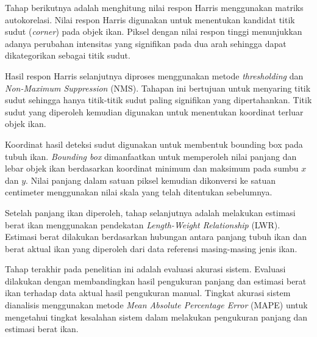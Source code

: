 Tahap berikutnya adalah menghitung nilai respon Harris menggunakan matriks autokorelasi. 
Nilai respon Harris digunakan untuk menentukan kandidat titik sudut (\emph{corner}) pada objek ikan. 
Piksel dengan nilai respon tinggi menunjukkan adanya perubahan intensitas yang signifikan pada dua arah sehingga dapat dikategorikan sebagai titik sudut.

Hasil respon Harris selanjutnya diproses menggunakan metode \emph{thresholding} dan \emph{Non-Maximum Suppression} (NMS). 
Tahapan ini bertujuan untuk menyaring titik sudut sehingga hanya titik-titik sudut paling signifikan yang dipertahankan. 
Titik sudut yang diperoleh kemudian digunakan untuk menentukan koordinat terluar objek ikan.

Koordinat hasil deteksi sudut digunakan untuk membentuk bounding box pada tubuh ikan. 
\emph{Bounding box} dimanfaatkan untuk memperoleh nilai panjang dan lebar objek ikan berdasarkan koordinat minimum dan maksimum pada sumbu \(x\) dan \(y\). 
Nilai panjang dalam satuan piksel kemudian dikonversi ke satuan centimeter menggunakan nilai skala yang telah ditentukan sebelumnya.

Setelah panjang ikan diperoleh, tahap selanjutnya adalah melakukan estimasi berat ikan menggunakan pendekatan \emph{Length-Weight Relationship} (LWR). 
Estimasi berat dilakukan berdasarkan hubungan antara panjang tubuh ikan dan berat aktual ikan yang diperoleh dari data referensi masing-masing jenis ikan.

Tahap terakhir pada penelitian ini adalah evaluasi akurasi sistem. 
Evaluasi dilakukan dengan membandingkan hasil pengukuran panjang dan estimasi berat ikan terhadap data aktual hasil pengukuran manual. 
Tingkat akurasi sistem dianalisis menggunakan metode \emph{Mean Absolute Percentage Error} (MAPE) untuk mengetahui tingkat kesalahan sistem dalam melakukan pengukuran panjang dan estimasi berat ikan.



